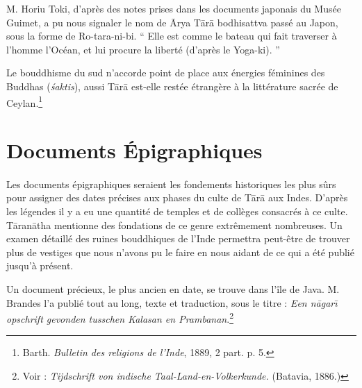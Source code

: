 \documentclass[a4paper, 11pt, oneside, french]{article}
\begin{document}
M. Horiu Toki, d'après des notes prises dans les documents japonais du Musée Guimet, a pu nous signaler le nom de \={A}rya T\={a}r\={a} bodhisattva passé au Japon, sous la forme de Ro-tara-ni-bi. `` Elle est comme le bateau qui fait traverser à l'homme l'Océan, et lui procure la liberté (d'après le Yoga-ki). ''

Le bouddhisme du sud n'accorde point de place aux énergies féminines des Buddhas (\emph{\'{s}aktis}), aussi T\={a}r\={a} est-elle restée étrangère à la littérature sacrée de Ceylan.\footnote{Barth. \emph{Bulletin des religions de l'Inde}, 1889, 2 part. p. 5.}
\clearpage
\section{Documents Épigraphiques}
\paragraph{}
Les documents épigraphiques seraient les fondements historiques les plus sûrs pour assigner des dates précises aux phases du culte de T\={a}r\={a} aux Indes. D'après les légendes il y a eu une quantité de temples et de collèges consacrés à ce culte. T\={a}ran\={a}tha mentionne des fondations de ce genre extrêmement nombreuses. Un examen détaillé des ruines bouddhiques de l'Inde permettra peut-être de trouver plus de vestiges que nous n'avons pu le faire en nous aidant de ce qui a été publié jusqu'à présent.

Un document précieux, le plus ancien en date, se trouve dans l'île de Java. M. Brandes l'a publié tout au long, texte et traduction, sous le titre : \emph{Een n\={a}gar\={\i} opschrift gevonden tusschen Kalasan en Prambanan}.\footnote{Voir : \emph{Tijdschrift von indische Taal-Land-en-Volkerkunde.} (Batavia, 1886.)}
\end{document}

